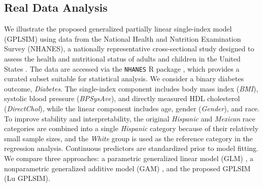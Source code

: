 
\newpage

\subsection{Real Data Analysis}

We illustrate the proposed generalized partially linear single-index model (GPLSIM) using data from the National Health and Nutrition Examination Survey (NHANES), a nationally representative cross-sectional study designed to assess the health and nutritional status of adults and children in the United States \cite{nhanes}. The data are accessed via the \texttt{NHANES} R package \cite{nhanesR}, which provides a curated subset suitable for statistical analysis. We consider a binary diabetes outcome, \textit{Diabetes}. The single-index component includes body mass index (\textit{BMI}), systolic blood pressure (\textit{BPSysAve}), and directly measured HDL cholesterol (\textit{DirectChol}), while the linear component includes age, gender (\textit{Gender}), and race. To improve stability and interpretability, the original \textit{Hispanic} and \textit{Mexican} race categories are combined into a single \textit{Hispanic} category because of their relatively small sample sizes, and the \textit{White} group is used as the reference category in the regression analysis. Continuous predictors are standardized prior to model fitting. We compare three approaches: a parametric generalized linear model (GLM) \cite{mccullagh1989glm}, a nonparametric generalized additive model (GAM) \cite{hastie1990gam}, and the proposed GPLSIM (Lu GPLSIM).


